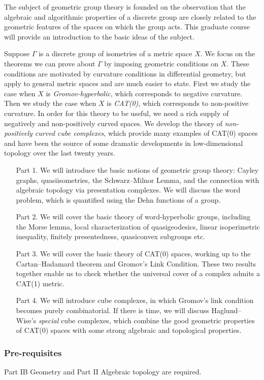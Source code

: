 \documentclass[a4paper]{article}
\begin{document}
\maketitle
{\small
\setlength{\parindent}{0em}
\setlength{\parskip}{1em}

The subject of geometric group theory is founded on the observation that the algebraic and algorithmic properties of a discrete group are closely related to the geometric features of the spaces on which the group acts. This graduate course will provide an introduction to the basic ideas of the subject.

Suppose $\Gamma$ is a discrete group of isometries of a metric space $X$. We focus on the theorems we can prove about $\Gamma$ by imposing geometric conditions on $X$. These conditions are motivated by curvature conditions in differential geometry, but apply to general metric spaces and are much easier to state. First we study the case when $X$ is \emph{Gromov-hyperbolic}, which corresponds to negative curvature. Then we study the case when $X$ is \emph{CAT(0)}, which corresponds to non-positive curvature. In order for this theory to be useful, we need a rich supply of negatively and non-positively curved spaces. We develop the theory of \emph{non-positively curved cube complexes}, which provide many examples of CAT(0) spaces and have been the source of some dramatic developments in low-dimensional topology over the last twenty years.

\begin{itemize}
  \item[Part 1.] We will introduce the basic notions of geometric group theory: Cayley graphs, quasiisometries, the Schwarz--Milnor Lemma, and the connection with algebraic topology via presentation complexes. We will discuss the word problem, which is quantified using the Dehn functions of a group.
  \item[Part 2.] We will cover the basic theory of word-hyperbolic groups, including the Morse lemma, local characterization of quasigeodesics, linear isoperimetric inequality, finitely presentedness, quasiconvex subgroups etc.
  \item[Part 3.] We will cover the basic theory of CAT(0) spaces, working up to the Cartan--Hadamard theorem and Gromov's Link Condition. These two results together enable us to check whether the universal cover of a complex admits a CAT(1) metric.
  \item[Part 4.] We will introduce cube complexes, in which Gromov's link condition becomes purely combinatorial. If there is time, we will discuss Haglund--Wise's \emph{special} cube complexes, which combine the good geometric properties of CAT(0) spaces with some strong algebraic and topological properties.
\end{itemize}

\subsubsection*{Pre-requisites}
Part IB Geometry and Part II Algebraic topology are required.
}
\end{document}
